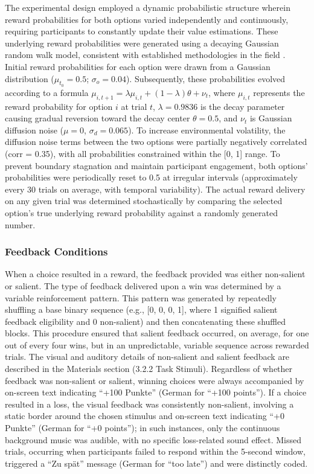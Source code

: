 The experimental design employed a dynamic probabilistic structure wherein reward probabilities for both options varied independently and continuously, requiring participants to constantly update their value estimations. These underlying reward probabilities were generated using a decaying Gaussian random walk model, consistent with established methodologies in the field \citep{daw2006}. Initial reward probabilities for each option were drawn from a Gaussian distribution ($\mu_{t_0} = 0.5$; $\sigma_o = 0.04$). Subsequently, these probabilities evolved according to a formula $\mu_{i,t+1} = \lambda\mu_{i,t} + (1-\lambda)\theta + \nu_t$, where $\mu_{i,t}$ represents the reward probability for option $i$ at trial $t$, $\lambda = 0.9836$ is the decay parameter causing gradual reversion toward the decay center $\theta = 0.5$, and $\nu_t$ is Gaussian diffusion noise ($\mu = 0$, $\sigma_d = 0.065$). To increase environmental volatility, the diffusion noise terms between the two options were partially negatively correlated (corr = 0.35), with all probabilities constrained within the [0, 1] range. To prevent boundary stagnation and maintain participant engagement, both options' probabilities were periodically reset to 0.5 at irregular intervals (approximately every 30 trials on average, with temporal variability). The actual reward delivery on any given trial was determined stochastically by comparing the selected option's true underlying reward probability against a randomly generated number.

\subsubsection{Feedback Conditions}

When a choice resulted in a reward, the feedback provided was either non-salient or salient. The type of feedback delivered upon a win was determined by a variable reinforcement pattern. This pattern was generated by repeatedly shuffling a base binary sequence (e.g., [0, 0, 0, 1], where 1 signified salient feedback eligibility and 0 non-salient) and then concatenating these shuffled blocks. This procedure ensured that salient feedback occurred, on average, for one out of every four wins, but in an unpredictable, variable sequence across rewarded trials. The visual and auditory details of non-salient and salient feedback are described in the Materials section (3.2.2 Task Stimuli). Regardless of whether feedback was non-salient or salient, winning choices were always accompanied by on-screen text indicating ``+100 Punkte'' (German for ``+100 points''). If a choice resulted in a loss, the visual feedback was consistently non-salient, involving a static border around the chosen stimulus and on-screen text indicating ``+0 Punkte'' (German for ``+0 points''); in such instances, only the continuous background music was audible, with no specific loss-related sound effect. Missed trials, occurring when participants failed to respond within the 5-second window, triggered a ``Zu spät'' message (German for ``too late'') and were distinctly coded.

